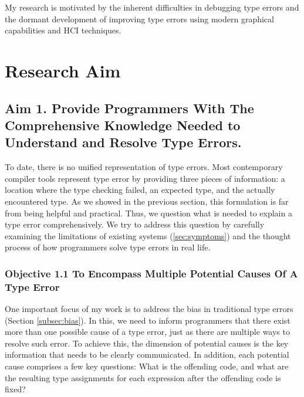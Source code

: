 

My research is motivated by the inherent difficulties in debugging type errors and the dormant development of improving type errors using modern graphical capabilities and HCI techniques.

\section{Research Aim}

\subsection{Aim 1. Provide Programmers With The Comprehensive Knowledge Needed to Understand and Resolve Type Errors.}

To date, there is no unified representation of type errors. Most contemporary compiler tools represent type error by providing three pieces of information: a location where the type checking failed, an expected type, and the actually encountered type. As we showed in the previous section, this formulation is far from being helpful and practical. Thus, we question what is needed to explain a type error comprehensively. We try to address this question by carefully examining the limitations of existing systems (\ref{sec:symptoms}) and the thought process of how programmers solve type errors in real life.

\subsubsection{Objective 1.1 To Encompass Multiple Potential Causes Of A Type Error}
One important focus of my work is to address the bias in traditional type errors (Section \ref{subsec:bias}). In this, we need to inform programmers that there exist more than one possible cause of a type error, just as there are multiple ways to resolve such error. To achieve this, the dimension of potential causes is the key information that needs to be clearly communicated. In addition, each potential cause comprises a few key questions: What is the offending code, and what are the resulting type assignments for each expression after the offending code is fixed?

